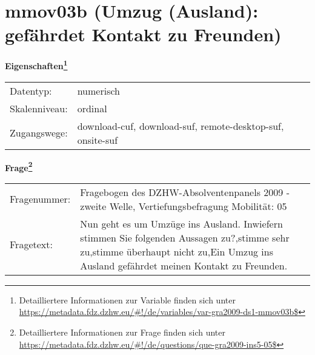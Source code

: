 
    \setcounter{footnote}{0}

    \vspace*{-1.8cm}
	\section{mmov03b (Umzug (Ausland): gefährdet Kontakt zu Freunden)}
	\label{section:mmov03b}



    \vspace*{0.5cm}
    \noindent\textbf{Eigenschaften\footnote{Detailliertere Informationen zur Variable finden sich unter
		\url{https://metadata.fdz.dzhw.eu/\#!/de/variables/var-gra2009-ds1-mmov03b$}}}\\
	\begin{tabularx}{\hsize}{@{}lX}
	Datentyp: & numerisch \\
	Skalenniveau: & ordinal \\
	Zugangswege: &
	  download-cuf, 
	  download-suf, 
	  remote-desktop-suf, 
	  onsite-suf
 \\
    \end{tabularx}



				\vspace*{0.5cm}
                \noindent\textbf{Frage\footnote{Detailliertere Informationen zur Frage finden sich unter
		              \url{https://metadata.fdz.dzhw.eu/\#!/de/questions/que-gra2009-ins5-05$}}}\\
				\begin{tabularx}{\hsize}{@{}lX}
					Fragenummer: &
					  Fragebogen des DZHW-Absolventenpanels 2009 - zweite Welle, Vertiefungsbefragung Mobilität:
					  05
 \\
					Fragetext: & Nun geht es um Umzüge ins Ausland. Inwiefern stimmen Sie folgenden Aussagen zu?,stimme sehr zu,stimme überhaupt nicht zu,Ein Umzug ins Ausland gefährdet meinen Kontakt zu Freunden. \\
				\end{tabularx}





